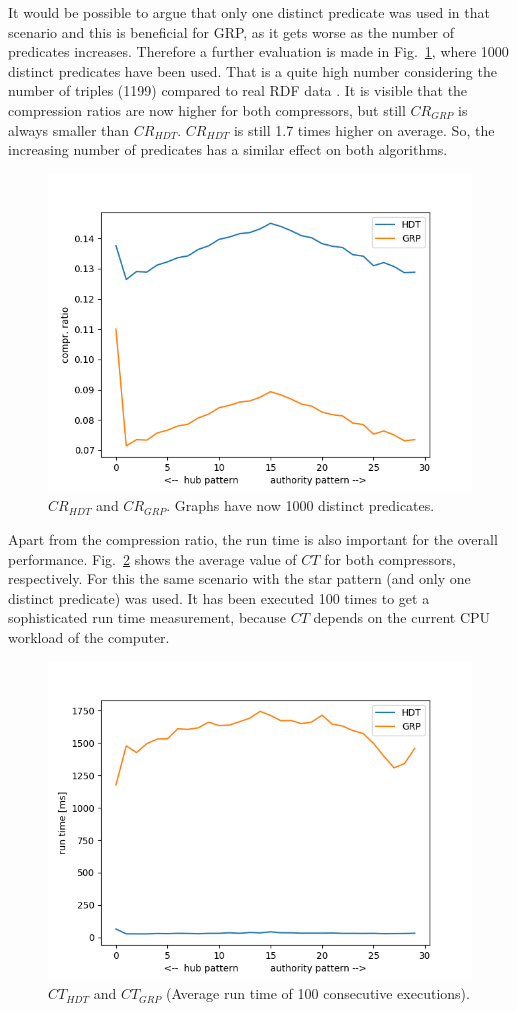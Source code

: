 It would be possible to argue that only one distinct predicate was used in that scenario and this is beneficial for GRP, as it gets worse as the number of predicates increases. Therefore a further evaluation is made in Fig.~\ref{fig:bothwithdict1000predicates}, where 1000 distinct predicates have been used. That is a quite high number considering the number of triples (1199) compared to real RDF data . It is visible that the compression ratios are now higher for both compressors, but still $CR_{GRP}$ is always smaller than $CR_{HDT}$. $CR_{HDT}$ is still 1.7 times higher on average. So, the increasing number of predicates has a similar effect on both algorithms.


\begin{figure}
	\centering
	\includegraphics[width=0.7\linewidth]{figures/GRPvsHDT/bothWithDict1000Predicates}
	\caption{$CR_{HDT}$ and $CR_{GRP}$. Graphs have now 1000 distinct predicates.}
	\label{fig:bothwithdict1000predicates}
\end{figure}

Apart from the compression ratio, the run time is also important for the overall performance. Fig.~\ref{fig:runtimes} shows the average value of $CT$ for both compressors, respectively. For this the same scenario with the star pattern (and only one distinct predicate) was used. It has been executed 100 times to get a sophisticated run time measurement, because $CT$ depends on the current CPU workload of the computer.


\begin{figure}
	\centering
	\includegraphics[width=0.7\linewidth]{figures/GRPvsHDT/runtimes}
	\caption{$CT_{HDT}$ and $CT_{GRP}$ (Average run time of 100 consecutive executions).}
	\label{fig:runtimes}
\end{figure}


